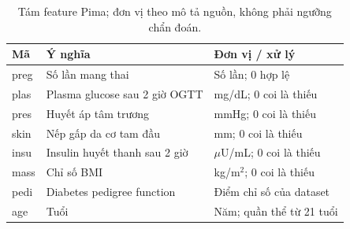 \par\FloatBarrier\begin{table}[H]\centering\small{}\setlength{\tabcolsep}{5pt}
\caption{Tám feature Pima; đơn vị theo mô tả nguồn, không phải ngưỡng chẩn đoán.}\begin{tabular}{P{2.2cm}P{6.5cm}P{5cm}}\toprule
Mã & Ý nghĩa & Đơn vị / xử lý\\\midrule
preg & Số lần mang thai & Số lần; 0 hợp lệ\\
plas & Plasma glucose sau 2 giờ OGTT & mg/dL; 0 coi là thiếu\\
pres & Huyết áp tâm trương & mmHg; 0 coi là thiếu\\
skin & Nếp gấp da cơ tam đầu & mm; 0 coi là thiếu\\
insu & Insulin huyết thanh sau 2 giờ & $\mu$U/mL; 0 coi là thiếu\\
mass & Chỉ số BMI & kg/m$^2$; 0 coi là thiếu\\
pedi & Diabetes pedigree function & Điểm chỉ số của dataset\\
age & Tuổi & Năm; quần thể từ 21 tuổi\\\bottomrule\end{tabular}\end{table}
